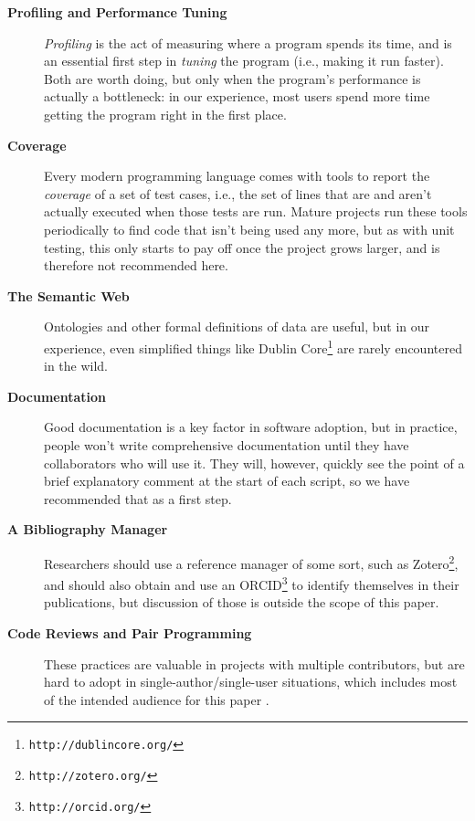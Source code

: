 \documentclass[10pt]{article}
\newcommand{\withurl}[2]{{#1}\footnote{\texttt{#2}}}
\begin{document}
\begin{description}
\item[\textbf{Profiling and Performance Tuning}]
  \emph{Profiling} is the act of measuring where a program spends its
  time, and is an essential first step in \emph{tuning} the program
  (i.e., making it run faster). Both are worth doing, but only when
  the program's performance is actually a bottleneck: in our
  experience, most users spend more time getting the program right in
  the first place.

\item[\textbf{Coverage}]
  Every modern programming language comes with tools to report the
  \emph{coverage} of a set of test cases, i.e., the set of lines that
  are and aren't actually executed when those tests are run. Mature
  projects run these tools periodically to find code that isn't being
  used any more, but as with unit testing, this only starts to pay off
  once the project grows larger, and is therefore not recommended
  here.

\item[\textbf{The Semantic Web}]
  Ontologies and other formal definitions of data are useful, but in
  our experience, even simplified things like \withurl{Dublin
    Core}{http://dublincore.org/} are rarely encountered in the wild.

\item[\textbf{Documentation}]
  Good documentation is a key factor in software adoption, but in
  practice, people won't write comprehensive documentation until they
  have collaborators who will use it. They will, however, quickly see
  the point of a brief explanatory comment at the start of each
  script, so we have recommended that as a first step.

\item[\textbf{A Bibliography Manager}] Researchers should use a
  reference manager of some sort, such as
  \withurl{Zotero}{http://zotero.org/}, and should also obtain and use an
  \withurl{ORCID}{http://orcid.org/} to identify themselves in their
  publications, but discussion of those is outside the scope of this
  paper.

\item[\textbf{Code Reviews and Pair Programming}]
  These practices are valuable in projects with multiple contributors,
  but are hard to adopt in single-author/single-user situations, which
  includes most of the intended audience for this paper \cite{petre2014}.

\end{description}
\end{document}
